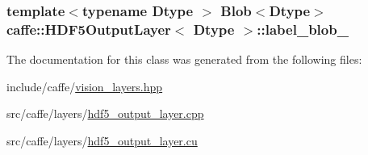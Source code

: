 \hypertarget{classcaffe_1_1_h_d_f5_output_layer_aef72be0097ab1894a5414b74512e3807}{
\subsubsection[{label\+\_\+blob\+\_\+}]{\setlength{\rightskip}{0pt plus 5cm}template$<$typename Dtype $>$ {\bf Blob}$<$Dtype$>$ {\bf caffe\+::\+H\+D\+F5\+Output\+Layer}$<$ Dtype $>$\+::label\+\_\+blob\+\_\+\hspace{0.3cm}{\ttfamily [protected]}}}\label{classcaffe_1_1_h_d_f5_output_layer_aef72be0097ab1894a5414b74512e3807}


The documentation for this class was generated from the following files\+:\begin{DoxyCompactItemize}
\item 
include/caffe/\hyperlink{vision__layers_8hpp}{vision\+\_\+layers.\+hpp}\item 
src/caffe/layers/\hyperlink{hdf5__output__layer_8cpp}{hdf5\+\_\+output\+\_\+layer.\+cpp}\item 
src/caffe/layers/\hyperlink{hdf5__output__layer_8cu}{hdf5\+\_\+output\+\_\+layer.\+cu}\end{DoxyCompactItemize}

